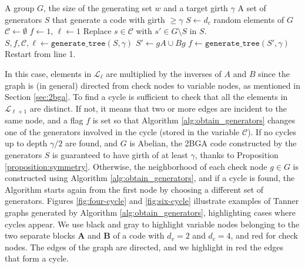 \documentclass[a4paper,twocolumn,11pt,accepted=2026-05-03]{quantumarticle}
\newcommand{\setc}{\mathcal{C}}
\begin{document}
\begin{algorithm}
    \caption{$\mathtt{get\_generators}$}
    \label{alg:obtain_generators}
    \begin{algorithmic}[1]
        \Require A group $G$, the size of the generating set $w$ and a target girth $\gamma$
        \Ensure A set of generators $S$ that generate a code with girth $\geq \gamma$
\State $S\gets d_c$ random elements of $G$ 
\State $\mathcal{C} \gets \emptyset$ 
\State $ f \gets 1 $, $\ell \gets 1 $
        \State Replace $s \in \setc$ with $s' \in G\setminus S$ in $S$.
    \EndIf
    \State $ S,f, \mathcal{C}, \ell \gets \mathtt{generate\_tree}(S, \gamma)$
\EndWhile
{}
        \State $S' \gets gA \cup Bg$
        \State $f  \gets \mathtt{generate\_tree}(S',\gamma)$
            \State Restart from line 1.
        \EndIf
    \EndFor
\EndIf
    \end{algorithmic}
\end{algorithm}




In this case, elements in \( \mathcal{L}_{\ell} \) are multiplied by the inverses of \( A \) and \( B \) since the graph is (in general) directed from check nodes to variable nodes, as mentioned in Section \ref{sec:2bga}. To find a cycle is sufficient to check that all the elements in $\mathcal{L}_{\ell +1}$ are distinct. If not, it means that two or more edges are incident to the same node, and a flag $f$ is set so that Algorithm \ref{alg:obtain_generators} changes one of the generators involved in the cycle (stored in the variable $\setc$). If no cycles up to depth $\gamma/2$ are found, and $G$ is Abelian, the 2BGA code constructed by the generators $S$ is guaranteed to have girth of at least $\gamma$, thanks to Proposition \ref{proposition:symmetry}. Otherwise, the neighborhood of each check node $g \in G$ is constructed using Algorithm \ref{alg:obtain_generators}, and if a cycle is found, the Algorithm starts again from the first node by choosing a different set of generators.
Figures \ref{fig:four-cycle} and \ref{fig:six-cycle} illustrate examples of Tanner graphs generated by Algorithm \ref{alg:obtain_generators}, highlighting cases where cycles appear.  We use black and gray to highlight variable nodes belonging to the two separate blocks $\mathbf{A}$ and $\mathbf{B}$ of a code with $d_v=2$ and $d_c=4$, and red for check nodes. The edges of the graph are directed, and we highlight in red the edges that form a cycle. 
\end{document}
